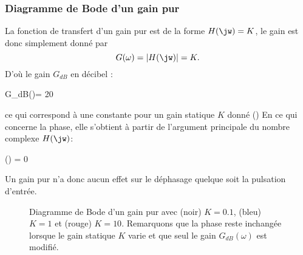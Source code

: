 \subsubsection{Diagramme de Bode d'un gain pur}
La fonction de transfert d'un gain pur est de la forme $H(\jw)=K$,
le gain est donc simplement donné par 
\[
G(\omega)=|H(\jw)|=K.
\] 
D'où le gain $G_{dB}$ en décibel :
\begin{bequation}
G_{dB}(\omega)= 20
\end{bequation} 
ce qui correspond à une constante pour un gain statique $K$ 
donné ()
En ce qui concerne la phase, elle s'obtient à partir de l'argument 
principale du nombre complexe $H(\jw)$:
\begin{bequation}
\phi(\omega) = 0
\end{bequation}
Un gain pur n'a donc aucun effet sur le déphasage quelque soit la pulsation
d'entrée.
\begin{figure}[!h]
    \centering
    

    
    \caption{Diagramme de Bode d'un gain pur avec (noir) 
             $K=0.1$, (bleu) $K=1$ et (rouge) $K=10$. Remarquons que la 
             phase reste inchangée lorsque le gain statique $K$ varie et que 
             seul le gain $G_{dB}(\omega)$ est modifié. \label{fig-bode_gain}}
\end{figure}
\newpage
